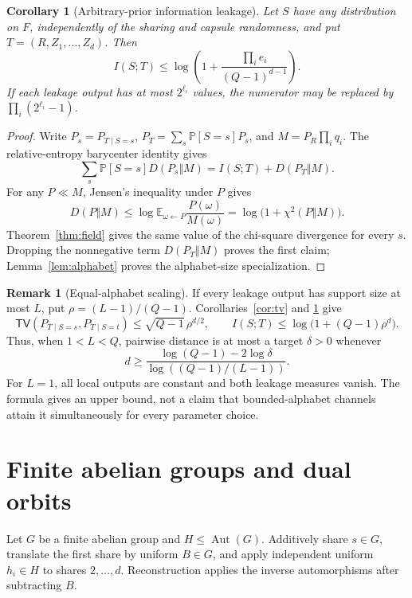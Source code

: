 \documentclass[11pt]{article}
\newtheorem{corollary}[theorem]{Corollary}
\theoremstyle{definition}
\newtheorem{remark}[theorem]{Remark}
\newcommand{\E}{\mathbb{E}}
\newcommand{\Prb}{\mathbb{P}}
\newcommand{\TV}{\mathsf{TV}}
\newcommand{\chitwo}{\chi^2}
\newcommand{\Aut}{\operatorname{Aut}}
\begin{document}
\begin{corollary}[Arbitrary-prior information leakage]\label{cor:mutual-information}
Let $S$ have any distribution on $F$, independently of the sharing and capsule
randomness, and put $T=(R,Z_1,\ldots,Z_d)$.  Then
\[
 I(S;T)\leq
 \log\left(1+\frac{\prod_i e_i}{(Q-1)^{d-1}}\right).
\]
If each leakage output has at most $2^{\ell_i}$ values, the numerator may be
replaced by $\prod_i(2^{\ell_i}-1)$.
\end{corollary}

\begin{proof}
Write $P_s=P_{T\mid S=s}$, $P_T=\sum_s\Prb[S=s]P_s$, and
$M=P_R\prod_iq_i$.  The relative-entropy barycenter identity gives
\[
 \sum_s\Prb[S=s]D(P_s\Vert M)
   =I(S;T)+D(P_T\Vert M).
\]
For any $P\ll M$, Jensen's inequality under $P$ gives
\[
 D(P\Vert M)
  \leq \log\E_{\omega\leftarrow P}\frac{P(\omega)}{M(\omega)}
  =\log\bigl(1+\chitwo(P\Vert M)\bigr).
\]
Theorem~\ref{thm:field} gives the same value of the chi-square divergence for
every $s$.  Dropping the nonnegative term $D(P_T\Vert M)$ proves the first
claim; Lemma~\ref{lem:alphabet} proves the alphabet-size specialization.
\end{proof}

\begin{remark}[Equal-alphabet scaling]\label{rem:scaling}
If every leakage output has support size at most $L$, put
$\rho=(L-1)/(Q-1)$.  Corollaries~\ref{cor:tv} and
\ref{cor:mutual-information} give
\[
 \TV(P_{T\mid S=s},P_{T\mid S=t})
    \leq \sqrt{Q-1}\,\rho^{d/2},
 \qquad
 I(S;T)\leq\log\bigl(1+(Q-1)\rho^d\bigr).
\]
Thus, when $1<L<Q$, pairwise distance is at most a target $\delta>0$ whenever
\[
 d\geq
 \frac{\log(Q-1)-2\log\delta}
      {\log((Q-1)/(L-1))}.
\]
For $L=1$, all local outputs are constant and both leakage measures vanish.
The formula gives an upper bound, not a claim that bounded-alphabet channels
attain it simultaneously for every parameter choice.
\end{remark}

\section{Finite abelian groups and dual orbits}

Let $G$ be a finite abelian group and $H\leq\Aut(G)$.  Additively share
$s\in G$, translate the first share by uniform $B\in G$, and apply independent
uniform $h_i\in H$ to shares $2,\ldots,d$.  Reconstruction applies the inverse
automorphisms after subtracting $B$.
\end{document}
